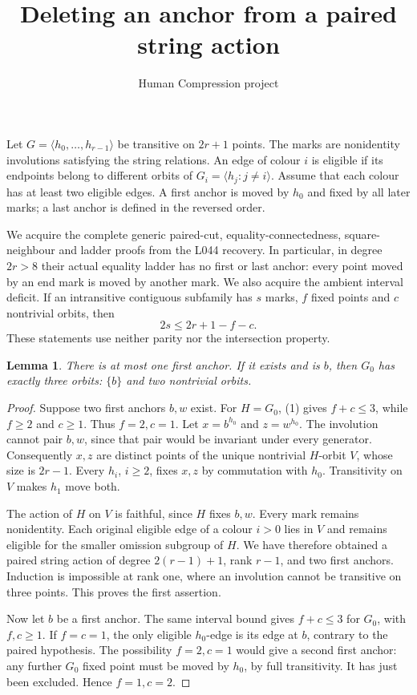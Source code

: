 \documentclass[11pt,a4paper]{article}
\title{Deleting an anchor from a paired string action}
\author{Human Compression project}\date{}
\newtheorem{lemma}{Lemma}
\newcommand{\gen}[1]{\langle#1\rangle}
\begin{document}
\maketitle
Let $G=\gen{h_0,\ldots,h_{r-1}}$ be transitive on $2r+1$ points.
The marks are nonidentity involutions satisfying the string relations.
An edge of colour $i$ is eligible if its endpoints belong to different
orbits of $G_i=\gen{h_j:j\ne i}$. Assume that each colour has at least
two eligible edges. A first anchor is moved by $h_0$ and fixed by all
later marks; a last anchor is defined in the reversed order.

We acquire the complete generic paired-cut, equality-connectedness,
square-neighbour and ladder proofs from the L044 recovery. In particular,
in degree $2r>8$ their actual equality ladder has no first or last
anchor: every point moved by an end mark is moved by another mark.
We also acquire the ambient interval deficit. If an intransitive
contiguous subfamily has $s$ marks, $f$ fixed points and $c$ nontrivial
orbits, then
\[
                         2s\le 2r+1-f-c.                 \tag{1}
\]
These statements use neither parity nor the intersection property.

\begin{lemma}\label{one}
There is at most one first anchor. If it exists and is $b$, then
$G_0$ has exactly three orbits: $\{b\}$ and two nontrivial orbits.
\end{lemma}
\begin{proof}
Suppose two first anchors $b,w$ exist. For $H=G_0$, (1) gives
$f+c\le3$, while $f\ge2$ and $c\ge1$. Thus $f=2,c=1$.
Let $x=b^{h_0}$ and $z=w^{h_0}$. The involution cannot pair $b,w$,
since that pair would be invariant under every generator. Consequently
$x,z$ are distinct points of the unique nontrivial $H$-orbit $V$,
whose size is $2r-1$. Every $h_i$, $i\ge2$, fixes $x,z$ by
commutation with $h_0$. Transitivity on $V$ makes $h_1$ move both.

The action of $H$ on $V$ is faithful, since $H$ fixes $b,w$.
Every mark remains nonidentity. Each original eligible edge of a
colour $i>0$ lies in $V$ and remains eligible for the smaller
omission subgroup of $H$. We have therefore obtained a paired
string action of degree $2(r-1)+1$, rank $r-1$, and two first
anchors. Induction is impossible at rank one, where an involution
cannot be transitive on three points. This proves the first assertion.

Now let $b$ be a first anchor. The same interval bound gives
$f+c\le3$ for $G_0$, with $f,c\ge1$. If $f=c=1$, the only
eligible $h_0$-edge is its edge at $b$, contrary to the paired
hypothesis. The possibility $f=2,c=1$ would give a second first
anchor: any further $G_0$ fixed point must be moved by $h_0$,
by full transitivity. It has just been excluded. Hence $f=1,c=2$.
\end{proof}
\end{document}
